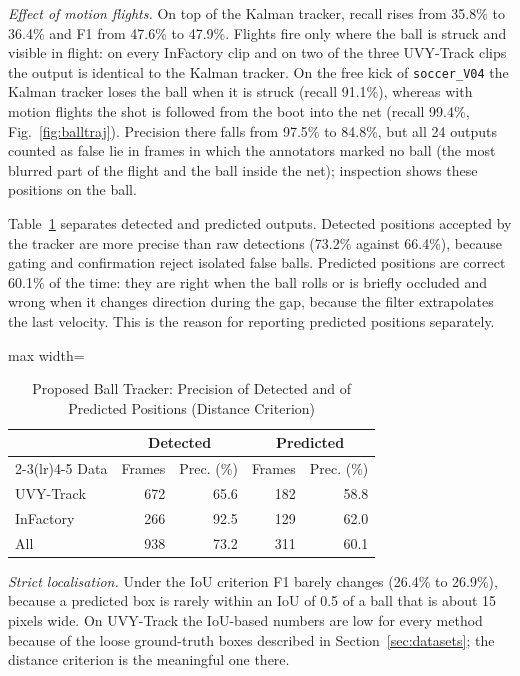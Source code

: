 \documentclass[conference]{IEEEtran}
\begin{document}
\emph{Effect of motion flights.} On top of the Kalman tracker, recall rises from
35.8\% to 36.4\% and F1 from 47.6\% to 47.9\%. Flights fire only where the ball is
struck and visible in flight: on every InFactory clip and on two of the three
UVY-Track clips the output is identical to the Kalman tracker. On the free kick of
\texttt{soccer\_V04} the Kalman tracker loses the ball when it is struck (recall
91.1\%), whereas with motion flights the shot is followed from the boot into the
net (recall 99.4\%, Fig.~\ref{fig:balltraj}). Precision there falls from 97.5\% to
84.8\%, but all 24 outputs counted as false lie in frames in which the annotators
marked no ball (the most blurred part of the flight and the ball inside the net);
inspection shows these positions on the ball.

Table~\ref{tab:ballpred} separates detected and predicted outputs. Detected
positions accepted by the tracker are more precise than raw detections (73.2\%
against 66.4\%), because gating and confirmation reject isolated false balls.
Predicted positions are correct 60.1\% of the time: they are right when the ball
rolls or is briefly occluded and wrong when it changes direction during the gap,
because the filter extrapolates the last velocity. This is the reason for
reporting predicted positions separately.

\begin{table}[t]
\caption{Proposed Ball Tracker: Precision of Detected and of Predicted Positions
(Distance Criterion)}
\label{tab:ballpred}
\centering
\footnotesize
\begin{adjustbox}{max width=\columnwidth}
\begin{tabular}{@{}lrrrr@{}}
\toprule
 & \multicolumn{2}{c}{Detected} & \multicolumn{2}{c}{Predicted} \\
\cmidrule(lr){2-3}\cmidrule(lr){4-5}
Data & Frames & Prec. (\%) & Frames & Prec. (\%) \\
\midrule
UVY-Track & 672 & 65.6 & 182 & 58.8 \\
InFactory & 266 & 92.5 & 129 & 62.0 \\
All & 938 & 73.2 & 311 & 60.1 \\
\bottomrule
\end{tabular}
\end{adjustbox}
\end{table}

\emph{Strict localisation.} Under the IoU criterion F1 barely changes (26.4\% to
26.9\%), because a predicted box is rarely within an IoU of 0.5 of a ball that
is about 15 pixels wide. On UVY-Track the IoU-based numbers are low for every
method because of the loose ground-truth boxes described in Section~\ref{sec:datasets}; the
distance criterion is the meaningful one there.
\end{document}
